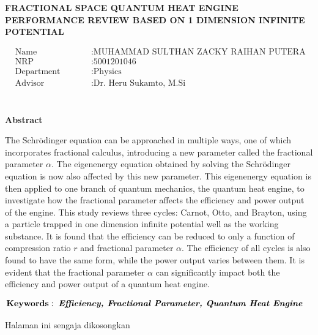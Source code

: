 \begin{center}
	\large{\textbf{FRACTIONAL SPACE QUANTUM HEAT ENGINE PERFORMANCE REVIEW BASED ON 1 DIMENSION INFINITE POTENTIAL}}
\end{center}
\begin{minipage}{5cm}
\begin{align*}
&\text{Name} \qquad &&: \text{MUHAMMAD SULTHAN ZACKY RAIHAN PUTERA HASAN} \\
&\text{NRP} \qquad &&: \text{5001201046} \\
&\text{Department} \qquad &&: \text{Physics} \\
&\text{Advisor}\qquad &&: \text{Dr. Heru Sukamto, M.Si}\\
\end{align*}
\end{minipage} \\
\textbf{Abstract}
\par The Schrödinger equation can be approached in multiple ways, one of which incorporates fractional calculus, introducing a new parameter called the fractional parameter \(\alpha\). The eigenenergy equation obtained by solving the Schrödinger equation is now also affected by this new parameter. This eigenenergy equation is then applied to one branch of quantum mechanics, the quantum heat engine, to investigate how the fractional parameter affects the efficiency and power output of the engine. This study reviews three cycles: Carnot, Otto, and Brayton, using a particle trapped in one dimension infinite potential well as the working substance. It is found that the efficiency can be reduced to only a function of compression ratio \(r\) and fractional parameter \(\alpha\). The efficiency of all cycles is also found to have the same form, while the power output varies between them. It is evident that the fractional parameter \(\alpha\) can significantly impact both the efficiency and power output of a quantum heat engine. \\
\begin{minipage}{1cm}
	\begin{align*}
	\text{\textbf{Keywords}}:\hspace{2mm}&\text{\textit{\textbf{Efficiency, Fractional Parameter, Quantum Heat Engine}}} 
	\end{align*}
\end{minipage}

\newpage
\thispagestyle{empty}
\vspace*{\fill}
    \begin{center}
	Halaman ini sengaja dikosongkan
    \end{center}
\vspace*{\fill}
\pagebreak